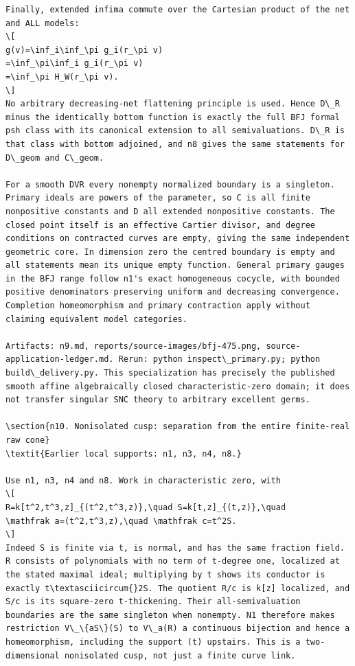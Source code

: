 \documentclass[
]{article}
\begin{document}
\begin{verbatim}
Finally, extended infima commute over the Cartesian product of the net and ALL models:
\[
g(v)=\inf_i\inf_\pi g_i(r_\pi v)
=\inf_\pi\inf_i g_i(r_\pi v)
=\inf_\pi H_W(r_\pi v).
\]
No arbitrary decreasing-net flattening principle is used. Hence D\_R minus the identically bottom function is exactly the full BFJ formal psh class with its canonical extension to all semivaluations. D\_R is that class with bottom adjoined, and n8 gives the same statements for D\_geom and C\_geom.

For a smooth DVR every nonempty normalized boundary is a singleton. Primary ideals are powers of the parameter, so C is all finite nonpositive constants and D all extended nonpositive constants. The closed point itself is an effective Cartier divisor, and degree conditions on contracted curves are empty, giving the same independent geometric core. In dimension zero the centred boundary is empty and all statements mean its unique empty function. General primary gauges in the BFJ range follow n1's exact homogeneous cocycle, with bounded positive denominators preserving uniform and decreasing convergence. Completion homeomorphism and primary contraction apply without claiming equivalent model categories.

Artifacts: n9.md, reports/source-images/bfj-475.png, source-application-ledger.md. Rerun: python inspect\_primary.py; python build\_delivery.py. This specialization has precisely the published smooth affine algebraically closed characteristic-zero domain; it does not transfer singular SNC theory to arbitrary excellent germs.

\section{n10. Nonisolated cusp: separation from the entire finite-real raw cone}
\textit{Earlier local supports: n1, n3, n4, n8.}

Use n1, n3, n4 and n8. Work in characteristic zero, with
\[
R=k[t^2,t^3,z]_{(t^2,t^3,z)},\quad S=k[t,z]_{(t,z)},\quad
\mathfrak a=(t^2,t^3,z),\quad \mathfrak c=t^2S.
\]
Indeed S is finite via t, is normal, and has the same fraction field. R consists of polynomials with no term of t-degree one, localized at the stated maximal ideal; multiplying by t shows its conductor is exactly t\textasciicircum{}2S. The quotient R/c is k[z] localized, and S/c is its square-zero t-thickening. Their all-semivaluation boundaries are the same singleton when nonempty. N1 therefore makes restriction V\_\{aS\}(S) to V\_a(R) a continuous bijection and hence a homeomorphism, including the support (t) upstairs. This is a two-dimensional nonisolated cusp, not just a finite curve link.


\end{verbatim}
\end{document}
